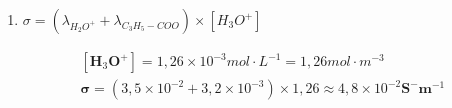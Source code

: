 \begin{enumerate}
    $$
    x_{\max }=c V=2,5 \times 10^{-2} V mol .
    $$

    Le taux d'avancement final vaut~:

    $$
    \tau=\frac{x_{f}}{x_{\max }}=\frac{1,26 \times 10^{-3}}{2,5 \times 10^{-2}} \approx 5,0 \times 10^{-2}=\mathbf{5 , 0} \%
    $$

    \item $\sigma=\left(\lambda_{H_{2} O^{+}}+\lambda_{C_{3} H_{5}-COO}\right) \times\left[H_{3} O^{+}\right]$

    $$
    \begin{gathered}
    {\left[\mathbf{H}_{3} \mathbf{O}^{+}\right]=1,26 \times 10^{-3} mol \cdot L^{-1}=1,26 mol \cdot m^{-3}} \\
    \boldsymbol{\sigma}=\left(3,5 \times 10^{-2}+3,2 \times 10^{-3}\right) \times 1,26 \approx 4,8 \times 10^{-2} \mathbf{S}^{-} \mathbf{m}^{-1}
    \end{gathered}
    $$

\end{enumerate}


